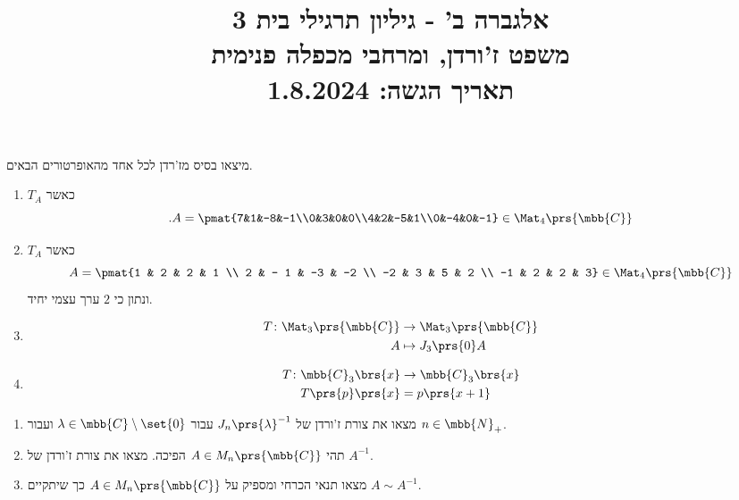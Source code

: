 \documentclass[a4paper,10pt,twoside,openany]{article}
\title{
אלגברה ב' - גיליון תרגילי בית 3 \\
משפט ז'ורדן, ומרחבי מכפלה פנימית
\\
\vspace{1cm}
\large{תאריך הגשה: 1.8.2024}
}
\date{}
\begin{document}
\maketitle

\begin{exercise}%
מיצאו בסיס מז'רדן לכל אחד מהאופרטורים הבאים.

\begin{enumerate}
\item
$T_A$
כאשר
\[\text{.} A = \pmat{7&1&-8&-1\\0&3&0&0\\4&2&-5&1\\0&-4&0&-1} \in \Mat_4\prs{\mbb{C}}\]

\item
$T_A$
כאשר
\[A=\pmat{1 & 2 & 2 & 1 \\ 2 & - 1 & -3 & -2 \\ -2 & 3 & 5 & 2 \\ -1 & 2 & 2 & 3} \in \Mat_4\prs{\mbb{C}}\]
ונתון כי
$2$
ערך עצמי יחיד.

\item
\begin{align*}
T \colon \Mat_3\prs{\mbb{C}} &\to \Mat_3\prs{\mbb{C}} \\
A &\mapsto J_3\prs{0} A
\end{align*}

\item
\begin{align*}
T \colon \mbb{C}_3\brs{x} &\to \mbb{C}_3\brs{x} \\
T\prs{p}\prs{x} &= p\prs{x+1}
\end{align*}
\end{enumerate}
\end{exercise}

\begin{exercise}%
\begin{enumerate}
\item מצאו את צורת ז'ורדן של
$J_n\prs{\lambda}^{-1}$
עבור
$\lambda \in \mbb{C}\setminus\set{0}$
ועבור
$n \in \mbb{N}_+$.

\item תהי
$A \in M_n\prs{\mbb{C}}$
הפיכה.
מצאו את צורת ז'ורדן של
$A^{-1}$.

\item מצאו תנאי הכרחי ומספיק על
$A \in M_n\prs{\mbb{C}}$
כך שיתקיים
$A \sim A^{-1}$.
\end{enumerate}
\end{exercise}
\end{document}
